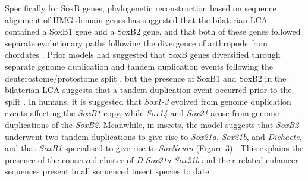 \documentclass[withindex,glossary]{cam-thesis}
\begin{document}
Specifically for SoxB genes, phylogenetic reconstruction based on
sequence alignment of HMG domain genes has suggested that the bilaterian
LCA contained a SoxB1 gene and a SoxB2 gene, and that both of these
genes followed separate evolutionary paths following the divergence of
arthropods from chordates . Prior models had
suggested that SoxB genes diversified through separate genome
duplication and tandem duplication events following the
deuterostome/protostome split , but the presence
of SoxB1 and SoxB2 in the bilaterian LCA suggests that a tandem
duplication event occurred prior to the split . In
humans, it is suggested that \emph{Sox1-3} evolved from genome
duplication events affecting the \emph{SoxB1} copy, while \emph{Sox14}
and \emph{Sox21} arose from genome duplications of the \emph{SoxB2}.
Meanwhile, in insects, the model suggests that \emph{SoxB2} underwent
two tandem duplications to give rise to \emph{Sox21a}, \emph{Sox21b},
and \emph{Dichaete}, and that \emph{SoxB1} specialised to give rise to
\emph{SoxNeuro} (Figure 3) . This explains the
presence of the conserved cluster of \emph{D-Sox21a-Sox21b} and their
related enhancer sequences present in all sequenced insect species to
date .
\end{document}
